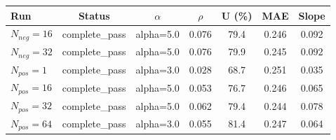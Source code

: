 \begin{tabular}{l c c c c c c}
\toprule
Run & Status & $\alpha$ & $\rho$ & U (\%) & MAE & Slope \\
\midrule
$N_{neg}=16$ & complete\_pass & alpha=5.0 & 0.076 & 79.4 & 0.246 & 0.092 \\
$N_{neg}=32$ & complete\_pass & alpha=5.0 & 0.076 & 79.9 & 0.245 & 0.092 \\
$N_{pos}=1$ & complete\_pass & alpha=3.0 & 0.028 & 68.7 & 0.251 & 0.035 \\
$N_{pos}=16$ & complete\_pass & alpha=5.0 & 0.053 & 76.7 & 0.246 & 0.065 \\
$N_{pos}=32$ & complete\_pass & alpha=5.0 & 0.062 & 79.4 & 0.244 & 0.078 \\
$N_{pos}=64$ & complete\_pass & alpha=3.0 & 0.055 & 81.4 & 0.247 & 0.064 \\
\bottomrule
\end{tabular}
